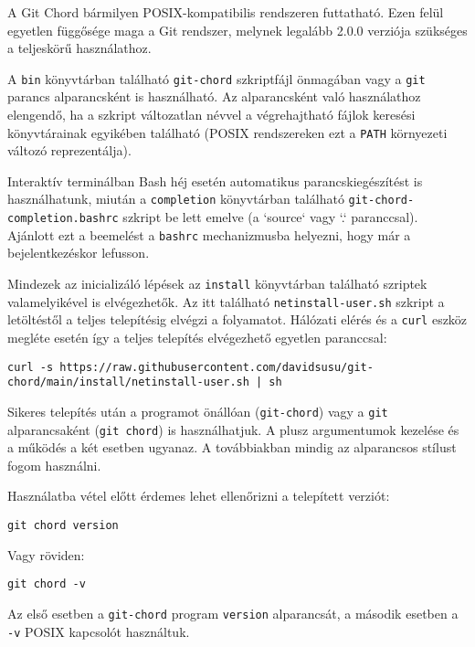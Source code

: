 \documentclass[final]{elteikthesis}[2025/03/25]
\begin{document}
A Git Chord bármilyen POSIX-kompatibilis rendszeren futtatható.
Ezen felül egyetlen függősége maga a Git rendszer,
melynek legalább 2.0.0 verziója szükséges a teljeskörű használathoz.

A \texttt{bin} könyvtárban található \texttt{git-chord} szkriptfájl önmagában vagy a \texttt{git} parancs alparancsként is használható.
Az alparancsként való használathoz elengendő, ha a szkript változatlan névvel a végrehajtható fájlok keresési könyvtárainak egyikében található (POSIX rendszereken ezt a \texttt{PATH} környezeti változó reprezentálja).

Interaktív terminálban Bash héj esetén automatikus parancskiegészítést is használhatunk,
miután a \texttt{completion} könyvtárban található \texttt{git-chord-completion.bashrc} szkript be lett emelve (a `source` vagy `.` paranccsal).
Ajánlott ezt a beemelést a \texttt{bashrc} mechanizmusba helyezni,
hogy már a bejelentkezéskor lefusson.

Mindezek az inicializáló lépések az \texttt{install} könyvtárban található szriptek valamelyikével is elvégezhetők.
Az itt található \texttt{netinstall-user.sh} szkript a letöltéstől a teljes telepítésig elvégzi a folyamatot.
Hálózati elérés és a \texttt{curl} eszköz megléte esetén így a teljes telepítés elvégezhető egyetlen paranccsal:

\begin{verbatim}
curl -s https://raw.githubusercontent.com/davidsusu/git-chord/main/install/netinstall-user.sh | sh
\end{verbatim}

Sikeres telepítés után a programot önállóan (\texttt{git-chord})
vagy a \texttt{git} alparancsaként (\texttt{git chord}) is használhatjuk.
A plusz argumentumok kezelése és a működés a két esetben ugyanaz.
A továbbiakban mindig az alparancsos stílust fogom használni.

Használatba vétel előtt érdemes lehet ellenőrizni a telepített verziót:

\begin{verbatim}
git chord version
\end{verbatim}

Vagy röviden:

\begin{verbatim}
git chord -v
\end{verbatim}

Az első esetben a \verb|git-chord| program \texttt{version} alparancsát,
a második esetben a \verb|-v| POSIX kapcsolót használtuk.
\end{document}
